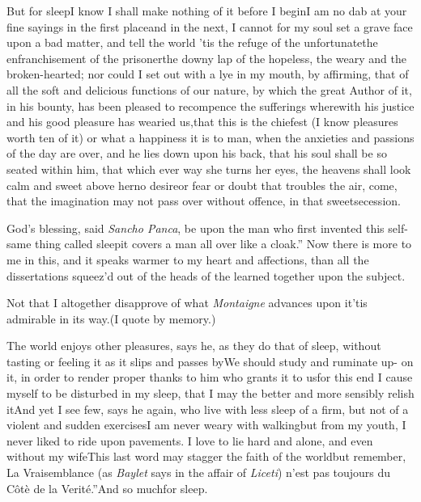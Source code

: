 \documentclass{article}
\begin{document}
But for sleep\tsk I know I shall make nothing of it before I begin\tsk I am no dab at
your fine sayings in the first place\break\tsk and in the
next, I cannot for my soul
set a grave face upon a bad matter, and tell the world\tsk
’tis the refuge of the unfortunate\tsk the enfranchisement
of the prisoner\tsk the downy lap of the hopeless, the
weary and the broken-hearted; nor could I set out with a
lye in my mouth, by affirming, that of all the soft and
delicious functions of our nature, by which the great Author
of it, in his bounty, has been pleased to recompence the
sufferings wherewith his justice and his good pleasure has
wearied us,\tsh that this is the chiefest (I know pleasures
worth ten of it) or what a happiness it is to man, when the
anxieties and passions of the day are over, and he lies down
upon his back, that his soul shall be so seated within him,
that which ever way she turns her eyes, the heavens shall
look calm and sweet above her\tsk no desire\tsk or fear\tsk
or doubt that troubles the air,
 come, that the imagination may not\break
pass over without offence, in that sweet\break secession.

\tsk\lqq God’s blessing, said \textit{Sancho Panca},\break
\lqq be upon the man who first invented\break
\lqq this self-same thing called sleep\tsk it\break
\lqq covers a man all over like a cloak.”\break
Now there is more to me in this, and it speaks warmer to my
heart and affections, than all the dissertations squeez’d out
of the heads of the learned together upon the subject.

\tsk Not that I altogether disapprove of what \textit{Montaigne} advances upon
it\tsk ’tis admirable in its way.\tsk (I quote by
memory.)

The world enjoys other pleasures, says
he, as they do that of sleep, without\break
tasting or feeling it as it slips and passes\break
by\tsk We should study and ruminate up-\break 
on it, in order to render proper thanks\break
to him who grants it to us\tsk for this end
I cause myself to be disturbed in my sleep, that I may the better and
more sensibly relish it\tsk And yet I see few, says he
again, who live with less sleep\break
{}\break
of a firm, but not of a violent and sudden
\break
exercises\tsk I am never weary with
walking\tsk but from my youth, I never liked to ride upon
pavements. I love to lie hard and alone, and even without my
wife\tsk This last word may stagger the faith of the
world\tsk but remember, \lqq La\break
\lqq Vraisemblance (as \textit{Baylet} says in the\break
\lqq affair of \textit{Liceti}) n’est pas toujours
\lqq du Côtè de la Verité.”\quad And so much\break for sleep.
\end{document}
